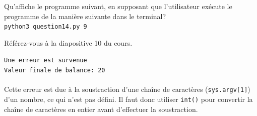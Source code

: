  \begin{Exercice}[5 minutes]
   Qu'affiche le programme suivant, en supposant que l'utilisateur exécute le programme de la manière suivante dans le terminal? \\ \newline 
   \texttt{python3 question14.py 9} \\ 
   \begin{conseil}
   Référez-vous à la diapositive 10 du cours.
   \end{conseil}
   
   \begin{solution}
   
\texttt{Une erreur est survenue \\
Valeur finale de balance: 20
    } \\ \\
    Cette erreur est due à la soustraction d'une chaîne de caractères (\texttt{sys.argv[1]}) d'un nombre, ce qui n'est pas défini. Il faut donc utiliser \texttt{int()} pour convertir la chaîne de caractères en entier avant d'effectuer la soustraction.
   \end{solution}
 \end{Exercice}

